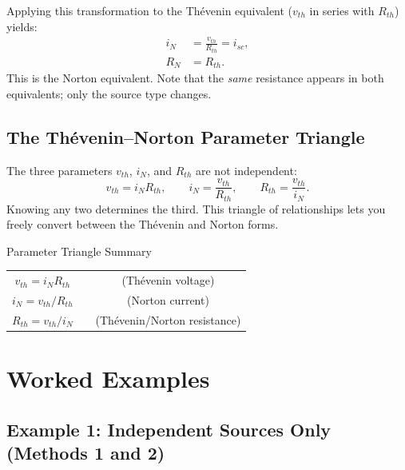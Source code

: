 \documentclass[twoside]{article}
\begin{document}
Applying this transformation to the Th\'{e}venin equivalent ($v_{th}$ in series with $R_{th}$) yields:
\begin{align}
    i_N &= \frac{v_{th}}{R_{th}} = i_{sc}, \\
    R_N &= R_{th}.
\end{align}
This is the Norton equivalent.  Note that the \emph{same} resistance appears in both equivalents; only the source type changes.

\subsection{The Th\'{e}venin--Norton Parameter Triangle}

The three parameters $v_{th}$, $i_N$, and $R_{th}$ are not independent:
\[
    v_{th} = i_N R_{th}, \qquad i_N = \frac{v_{th}}{R_{th}}, \qquad R_{th} = \frac{v_{th}}{i_N}.
\]
Knowing any two determines the third.  This triangle of relationships lets you freely convert between the Th\'{e}venin and Norton forms.

\begin{cyanbox}{Parameter Triangle Summary}
\begin{center}
\begin{tabular}{ccc}
    $v_{th} = i_N R_{th}$ & \quad & (Th\'{e}venin voltage) \\[4pt]
    $i_N   = v_{th}/R_{th}$ & \quad & (Norton current) \\[4pt]
    $R_{th} = v_{th}/i_N$ & \quad & (Th\'{e}venin/Norton resistance)
\end{tabular}
\end{center}
\end{cyanbox}

\section{Worked Examples}

\subsection{Example 1: Independent Sources Only (Methods 1 and 2)}
\end{document}
